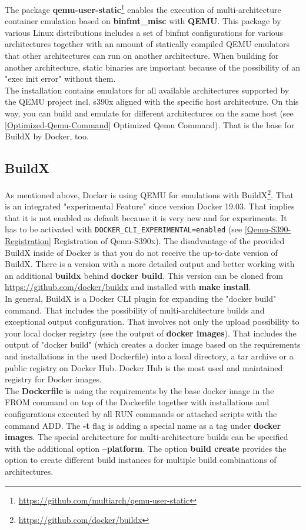 The package \textbf{qemu-user-static}\footnote{\url{https://github.com/multiarch/qemu-user-static}} enables the execution of multi-architecture container emulation based on \textbf{binfmt\_misc} with \textbf{QEMU}. This package by various Linux distributions includes a set of binfmt configurations for various architectures together with an amount of statically compiled QEMU emulators that other architectures can run on another architecture\cite{Yang2019}. When building for another architecture, static binaries are important because of the possibility of an "exec init error" without them. \\
The installation contains emulators for all available architectures supported by the QEMU project incl. s390x aligned with the specific host architecture. On this way, you can build and emulate for different architectures on the same host (see \ref{Optimized-Qemu-Command} Optimized Qemu Command). That is the base for BuildX by Docker, too.

\subsection{BuildX}

As mentioned above, Docker is using QEMU for emulations with BuildX\footnote{\url{https://github.com/docker/buildx}}. That is an integrated "experimental Feature" since version Docker 19.03. That implies that it is not enabled as default because it is very new and for experiments. It has to be activated with \lstinline!DOCKER_CLI_EXPERIMENTAL=enabled! (see \ref{Qemu-S390-Registration} Registration of Qemu-S390x). The disadvantage of the provided BuildX inside of Docker is that you do not receive the up-to-date version of BuildX. There is a version with a more detailed output and better working with an additional \textbf{buildx} behind \textbf{docker build}. This version can be cloned from \url{https://github.com/docker/buildx} and installed with \textbf{make install}. \\
In general, BuildX is a Docker CLI plugin for expanding the "docker build" command. That includes the possibility of multi-architecture builds and exceptional output configuration. That involves not only the upload possibility to your local docker registry (see the output of \textbf{docker images}). That includes the output of "docker build" (which creates a docker image based on the requirements and installations in the used Dockerfile) into a local directory, a tar archive or a public registry on Docker Hub. Docker Hub is the most used and maintained registry for Docker images. \\
The \textbf{Dockerfile} is using the requirements by the base docker image in the FROM command on top of the Dockerfile together with installations and configurations executed by all RUN commands or attached scripts with the command ADD. The \textbf{-t} flag is adding a special name as a tag under \textbf{docker images}.
The special architecture for multi-architecture builds can be specified with the additional option \textbf{--platform}.
The option \textbf{build create} provides the option to create different build instances for multiple build combinations of architectures.

